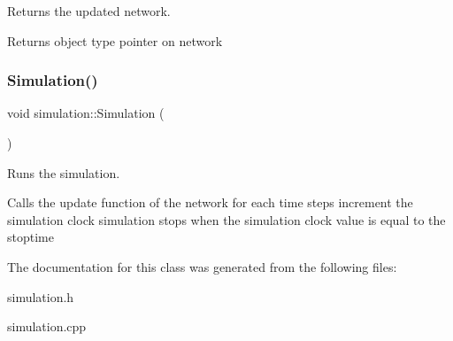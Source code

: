 Returns the updated network. 

\begin{DoxyReturn}{Returns}
object type pointer on network 
\end{DoxyReturn}
\mbox{\label{classsimulation_a56832e923bc907f588e5268b9423a57e}} 
\subsubsection{\texorpdfstring{Simulation()}{Simulation()}}
{\footnotesize\ttfamily void simulation\+::\+Simulation (\begin{DoxyParamCaption}{ }\end{DoxyParamCaption})}



Runs the simulation. 

Calls the update function of the network for each time steps increment the simulation clock simulation stops when the simulation clock value is equal to the stoptime 

The documentation for this class was generated from the following files\+:\begin{DoxyCompactItemize}
\item 
simulation.\+h\item 
simulation.\+cpp\end{DoxyCompactItemize}
